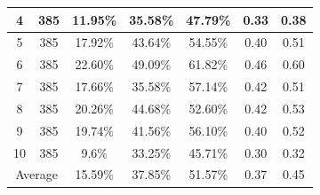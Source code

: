 \documentclass{sig-alternate}
\begin{document}
\begin{table}[]
\begin{tabular}{@{}|c|c|c|c|c|c|c|@{}}
4                                                                               & 385                                                                      & \multicolumn{1}{l|}{11.95\%}                       & \multicolumn{1}{l|}{35.58\%}                       & 47.79\%                                                &  0.33   &  0.38  \\ \midrule 
5                                                                               & 385                                                                      & 17.92\%                                                 & 43.64\%                                                 & 54.55\%                                                  &  0.40   & 0.51     \\ \midrule
6
&
385
&22.60\% &
49.09\% &
61.82\% & 0.46 &
0.60     \\  \midrule
7
&
385
&17.66\% &
35.58\% &
57.14\% & 0.42 &
0.51     \\  \midrule
8
&
385
&20.26\% &
44.68\% &
52.60\% & 0.42 &
0.53    \\  \midrule
9
&
385
&19.74\% &
41.56\% &
56.10\% & 0.40 &
0.52    \\  \midrule
10
&
385
&9.6\% &
33.25\% &
45.71\% & 0.30 &
0.32    \\  \midrule
\multicolumn{2}{|c|}{Average}                                                                                                                                & 15.59\%                                                 & 37.85\%                                                 & 51.57\%                                                  &   0.37  &  0.45    \\ \bottomrule

\end{tabular}
\end{table}
\end{document}

